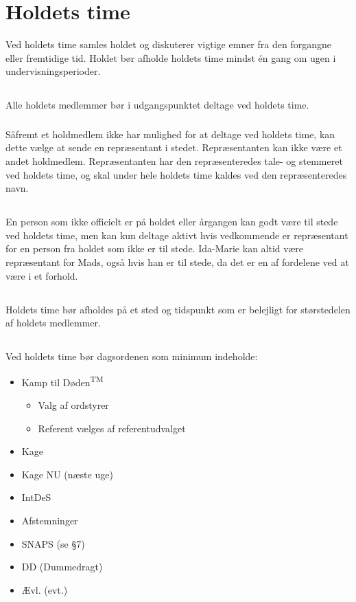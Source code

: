 \documentclass{article}
\let\OldS\S
\renewcommand{\S}{\OldS{}}
\begin{document}
	
	\section{Holdets time}
	Ved holdets time samles holdet og diskuterer vigtige emner fra den forgangne eller 
	fremtidige tid. Holdet bør afholde holdets time mindst én gang om ugen i 
	undervisningsperioder.
	\subsection{}
	Alle holdets medlemmer bør i udgangspunktet deltage ved holdets time.
	\subsubsection{}
	Såfremt et holdmedlem ikke har mulighed for at deltage ved holdets time, kan dette vælge at sende en repræsentant i stedet. Repræsentanten kan ikke være et andet holdmedlem. Repræsentanten har den repræsenteredes tale- og stemmeret ved holdets time, og skal under hele holdets time kaldes ved den repræsenteredes navn.
	\subsection{}
	En person som ikke officielt er på holdet eller årgangen kan godt være til stede ved holdets time, men kan kun deltage aktivt hvis vedkommende er repræsentant for en person fra holdet som ikke er til stede. Ida-Marie kan altid være repræsentant for Mads, også hvis han er til stede, da det er en af fordelene ved at være i et forhold.
	\subsection{}
	Holdets time bør afholdes på et sted og tidspunkt som er belejligt for størstedelen af holdets medlemmer.
	\subsection{}
	Ved holdets time bør dagsordenen som minimum indeholde:\\
	\begin{itemize}
		\item Kamp til Døden\textsuperscript{TM}
		\begin{itemize}
			\item Valg af ordstyrer
			\item Referent vælges af referentudvalget
		\end{itemize}
		\item Kage
		\item Kage NU (næste uge)
		\item IntDeS
		\item Afstemninger
		\item SNAPS (se \S{7})
		\item DD (Dummedragt)
		\item Ævl. (evt.)
	\end{itemize}
\end{document}
